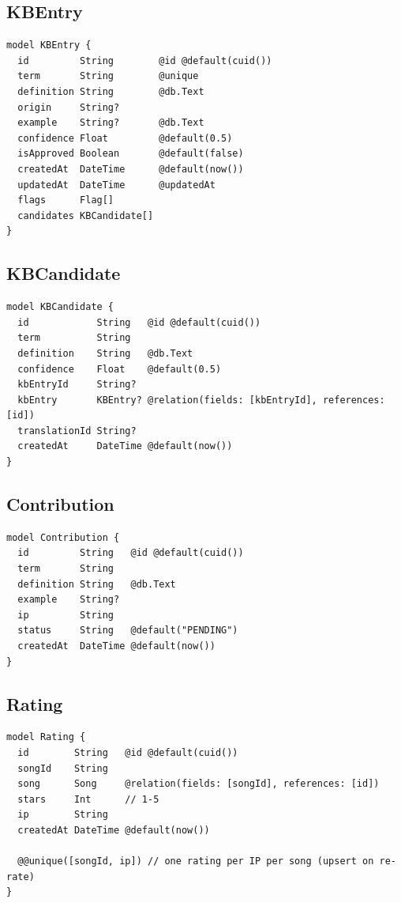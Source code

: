 \documentclass[12pt, a4paper]{article}
\begin{document}
\subsection{KBEntry}
\begin{tcolorbox}[codebox]
\begin{lstlisting}
model KBEntry {
  id         String        @id @default(cuid())
  term       String        @unique
  definition String        @db.Text
  origin     String?
  example    String?       @db.Text
  confidence Float         @default(0.5)
  isApproved Boolean       @default(false)
  createdAt  DateTime      @default(now())
  updatedAt  DateTime      @updatedAt
  flags      Flag[]
  candidates KBCandidate[]
}
\end{lstlisting}
\end{tcolorbox}

\subsection{KBCandidate}
\begin{tcolorbox}[codebox]
\begin{lstlisting}
model KBCandidate {
  id            String   @id @default(cuid())
  term          String
  definition    String   @db.Text
  confidence    Float    @default(0.5)
  kbEntryId     String?
  kbEntry       KBEntry? @relation(fields: [kbEntryId], references: [id])
  translationId String?
  createdAt     DateTime @default(now())
}
\end{lstlisting}
\end{tcolorbox}

\subsection{Contribution}
\begin{tcolorbox}[codebox]
\begin{lstlisting}
model Contribution {
  id         String   @id @default(cuid())
  term       String
  definition String   @db.Text
  example    String?
  ip         String
  status     String   @default("PENDING")
  createdAt  DateTime @default(now())
}
\end{lstlisting}
\end{tcolorbox}

\subsection{Rating}
\begin{tcolorbox}[codebox]
\begin{lstlisting}
model Rating {
  id        String   @id @default(cuid())
  songId    String
  song      Song     @relation(fields: [songId], references: [id])
  stars     Int      // 1-5
  ip        String
  createdAt DateTime @default(now())

  @@unique([songId, ip]) // one rating per IP per song (upsert on re-rate)
}
\end{lstlisting}
\end{tcolorbox}
\end{document}
